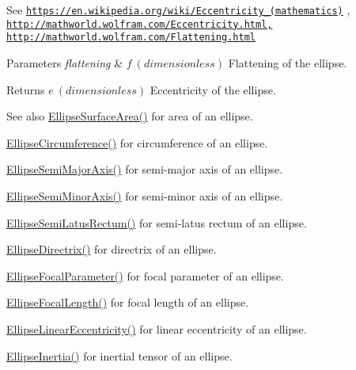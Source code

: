 See \href{https://en.wikipedia.org/wiki/Eccentricity_(mathematics)}{\tt https\+://en.\+wikipedia.\+org/wiki/\+Eccentricity\+\_\+(mathematics)} , \href{http://mathworld.wolfram.com/Eccentricity.html,}{\tt http\+://mathworld.\+wolfram.\+com/\+Eccentricity.\+html,} \href{http://mathworld.wolfram.com/Flattening.html}{\tt http\+://mathworld.\+wolfram.\+com/\+Flattening.\+html} 
\begin{DoxyParams}{Parameters}
{\em flattening} & $ f\ (dimensionless)$ Flattening of the ellipse. \\
\hline
\end{DoxyParams}
\begin{DoxyReturn}{Returns}
$ e\ (dimensionless)$ Eccentricity of the ellipse. 
\end{DoxyReturn}
\begin{DoxySeeAlso}{See also}
\mbox{\hyperlink{group___e_g_x_math-_geometry-2_d-_ellipse-_surface_area_ga4ce8c8323e9718ce5458f4ab7f6d823d}{Ellipse\+Surface\+Area()}} for area of an ellipse. 

\mbox{\hyperlink{group___e_g_x_math-_geometry-2_d-_ellipse-_circumference_ga4172802ac674eb53467b44928ac635c7}{Ellipse\+Circumference()}} for circumference of an ellipse. 

\mbox{\hyperlink{group___e_g_x_math-_geometry-2_d-_ellipse-_semi_major_axis_ga646a2ca065f4ac3f666a9ea22f3bb527}{Ellipse\+Semi\+Major\+Axis()}} for semi-\/major axis of an ellipse. 

\mbox{\hyperlink{group___e_g_x_math-_geometry-2_d-_ellipse-_semi_minor_axis_gae461acf3333565d69527dd86e9aa2b32}{Ellipse\+Semi\+Minor\+Axis()}} for semi-\/minor axis of an ellipse. 

\mbox{\hyperlink{group___e_g_x_math-_geometry-2_d-_ellipse-_semi_latus_rectum_gacfd1844eb4ef3d1ee3c0b460a6442ae6}{Ellipse\+Semi\+Latus\+Rectum()}} for semi-\/latus rectum of an ellipse. 

\mbox{\hyperlink{group___e_g_x_math-_geometry-2_d-_ellipse-_directrix_gace8f72a8efbc9c18d3eb689151405106}{Ellipse\+Directrix()}} for directrix of an ellipse. 

\mbox{\hyperlink{group___e_g_x_math-_geometry-2_d-_ellipse-_focal_parameter_ga4cd01a38c72c092ef9791351948bf69b}{Ellipse\+Focal\+Parameter()}} for focal parameter of an ellipse. 

\mbox{\hyperlink{group___e_g_x_math-_geometry-2_d-_ellipse-_focal_length_gab8d63de7640c880cfecaeada6f2afdac}{Ellipse\+Focal\+Length()}} for focal length of an ellipse. 

\mbox{\hyperlink{group___e_g_x_math-_geometry-2_d-_ellipse-_linear_eccentricity_gac70b3010e30aa8b73deb50fe2b9b9a91}{Ellipse\+Linear\+Eccentricity()}} for linear eccentricity of an ellipse. 

\mbox{\hyperlink{group___e_g_x_math-_geometry-2_d-_ellipse-_inertia_ga10a3049c2f04b50f271fb01dc62e4cf8}{Ellipse\+Inertia()}} for inertial tensor of an ellipse. 
\end{DoxySeeAlso}
